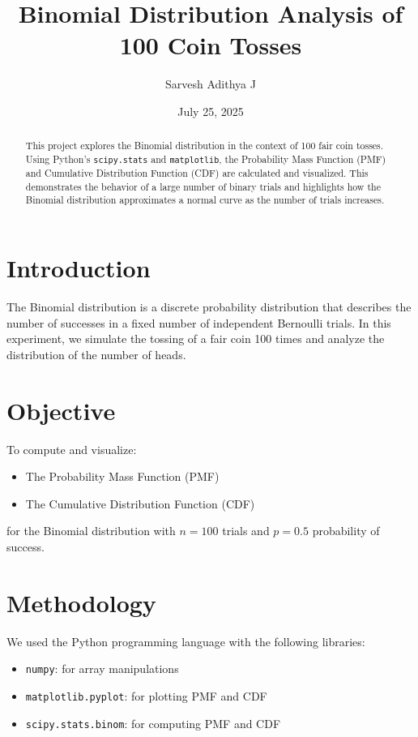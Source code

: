 \documentclass[12pt]{article}
\title{Binomial Distribution Analysis of 100 Coin Tosses}
\author{Sarvesh Adithya J}
\date{July 25, 2025}
\begin{document}
\maketitle

\begin{abstract}
This project explores the Binomial distribution in the context of 100 fair coin tosses. Using Python's \texttt{scipy.stats} and \texttt{matplotlib}, the Probability Mass Function (PMF) and Cumulative Distribution Function (CDF) are calculated and visualized. This demonstrates the behavior of a large number of binary trials and highlights how the Binomial distribution approximates a normal curve as the number of trials increases.
\end{abstract}

\section{Introduction}
The Binomial distribution is a discrete probability distribution that describes the number of successes in a fixed number of independent Bernoulli trials. In this experiment, we simulate the tossing of a fair coin 100 times and analyze the distribution of the number of heads.

\section{Objective}
To compute and visualize:
\begin{itemize}
    \item The Probability Mass Function (PMF)
    \item The Cumulative Distribution Function (CDF)
\end{itemize}
for the Binomial distribution with $n = 100$ trials and $p = 0.5$ probability of success.

\section{Methodology}
We used the Python programming language with the following libraries:
\begin{itemize}
    \item \texttt{numpy}: for array manipulations
    \item \texttt{matplotlib.pyplot}: for plotting PMF and CDF
    \item \texttt{scipy.stats.binom}: for computing PMF and CDF
\end{itemize}
\end{document}

